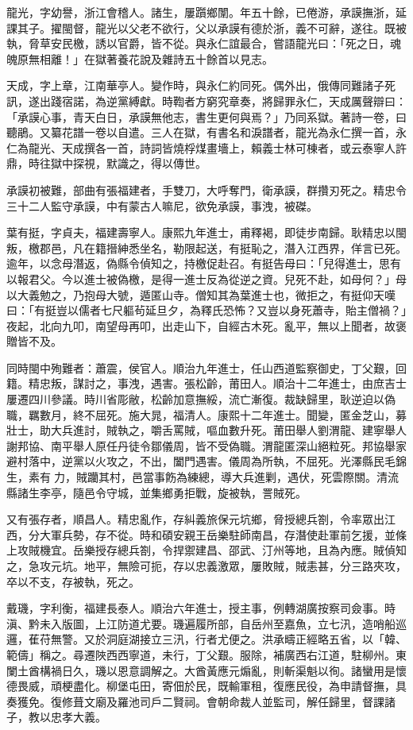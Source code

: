 \begin{pinyinscope}
龍光，字幼譽，浙江會稽人。諸生，屢躓鄉闈。年五十餘，已倦游，承謨撫浙，延課其子。擢閩督，龍光以父老不欲行，父以承謨有德於浙，義不可辭，遂往。既被執，脅草安民檄，誘以官爵，皆不從。與永仁誼最合，嘗語龍光曰：「死之日，魂魄原無相離！」在獄著養花說及雜詩五十餘首以見志。

天成，字上章，江南華亭人。變作時，與永仁約同死。偶外出，俄傳同難諸子死訊，遂出踐宿諾，為逆黨縛獻。時鞫者方窮究章奏，將歸罪永仁，天成厲聲辯曰：「承謨心事，青天白日，承謨無他志，書生更何與焉？」乃同系獄。著詩一卷，曰聽鵑。又纂花譜一卷以自遣。三人在獄，有書名和淚譜者，龍光為永仁撰一首，永仁為龍光、天成撰各一首，詩詞皆燒桴煤畫墻上，賴義士林可棟者，或云泰寧人許鼎，時往獄中探視，默識之，得以傳世。

承謨初被難，部曲有張福建者，手雙刀，大呼奪門，衛承謨，群攢刃死之。精忠令三十二人監守承謨，中有蒙古人嘛尼，欲免承謨，事洩，被磔。

葉有挺，字貞夫，福建壽寧人。康熙九年進士，甫釋褐，即徒步南歸。耿精忠以閩叛，檄郡邑，凡在籍搢紳悉坐名，勒限起送，有挺恥之，潛入江西界，佯言已死。逾年，以念母潛返，偽縣令偵知之，持檄促赴召。有挺告母曰：「兒得進士，思有以報君父。今以進士被偽檄，是得一進士反為從逆之資。兒死不赴，如母何？」母以大義勉之，乃抱母大號，遁匿山寺。僧知其為葉進士也，微拒之，有挺仰天嘆曰：「有挺豈以儒者七尺軀茍延旦夕，為釋氏恐怖？又豈以身死蕭寺，貽主僧禍？」夜起，北向九叩，南望母再叩，出走山下，自經古木死。亂平，無以上聞者，故褒贈皆不及。

同時閩中殉難者：蕭震，侯官人。順治九年進士，任山西道監察御史，丁父艱，回籍。精忠叛，謀討之，事洩，遇害。張松齡，莆田人。順治十二年進士，由庶吉士屢遷四川參議。時川省彫敝，松齡加意撫綏，流亡漸復。裁缺歸里，耿逆迫以偽職，羈數月，終不屈死。施大晁，福清人。康熙十二年進士。聞變，匿金芝山，募壯士，助大兵進討，賊執之，嚼舌罵賊，嘔血數升死。莆田舉人劉渭龍、建寧舉人謝邦協、南平舉人原任丹徒令鄒儀周，皆不受偽職。渭龍匿深山絕粒死。邦協舉家避村落中，逆黨以火攻之，不出，闔門遇害。儀周為所執，不屈死。光澤縣民毛錦生，素有力，賊躪其村，邑當事飭為練總，導大兵進剿，遇伏，死雲際關。清流縣諸生李亭，隨邑令守城，並集鄉勇拒戰，旋被執，詈賊死。

又有張存者，順昌人。精忠亂作，存糾義旅保元坑鄉，脅授總兵劄，令率眾出江西，分大軍兵勢，存不從。時和碩安親王岳樂駐師南昌，存潛使赴軍前乞援，並條上攻賊機宜。岳樂授存總兵劄，令捍禦建昌、邵武、汀州等地，且為內應。賊偵知之，急攻元坑。地平，無險可扼，存以忠義激眾，屢敗賊，賊恚甚，分三路夾攻，卒以不支，存被執，死之。

戴璣，字利衡，福建長泰人。順治六年進士，授主事，例轉湖廣按察司僉事。時滇、黔未入版圖，上江防道尤要。璣遍履所部，自岳州至嘉魚，立七汛，造哨船巡邏，萑苻無警。又於洞庭湖接立三汛，行者尤便之。洪承疇正經略五省，以「韓、範儔」稱之。尋遷陜西西寧道，未行，丁父艱。服除，補廣西右江道，駐柳州。東闌土酋構禍日久，璣以恩意調解之。大酋黃應元煽亂，則斬渠魁以徇。諸蠻用是懷德畏威，頑梗盡化。柳堡屯田，寄佃於民，既輸軍租，復應民役，為申請督撫，具奏獲免。復修葺文廟及羅池司戶二賢祠。會朝命裁人並監司，解任歸里，督課諸子，教以忠孝大義。


\end{pinyinscope}
